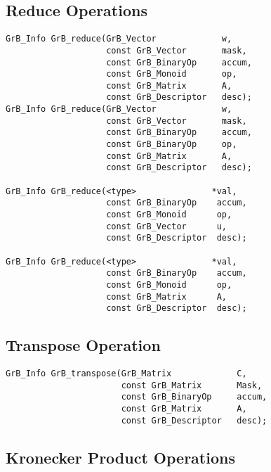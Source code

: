\documentclass[11pt]{article}
\begin{document}
\subsection{Reduce Operations}

\begin{verbatim}
GrB_Info GrB_reduce(GrB_Vector             w,
                    const GrB_Vector       mask,
                    const GrB_BinaryOp     accum,
                    const GrB_Monoid       op,  
                    const GrB_Matrix       A,
                    const GrB_Descriptor   desc);
GrB_Info GrB_reduce(GrB_Vector             w,
                    const GrB_Vector       mask,
                    const GrB_BinaryOp     accum,
                    const GrB_BinaryOp     op,  
                    const GrB_Matrix       A,
                    const GrB_Descriptor   desc);

GrB_Info GrB_reduce(<type>               *val,
                    const GrB_BinaryOp    accum,
                    const GrB_Monoid      op,
                    const GrB_Vector      u,
                    const GrB_Descriptor  desc);

GrB_Info GrB_reduce(<type>               *val,
                    const GrB_BinaryOp    accum,
                    const GrB_Monoid      op,
                    const GrB_Matrix      A,
                    const GrB_Descriptor  desc);
\end{verbatim}

\subsection{Transpose Operation}

\begin{verbatim}
GrB_Info GrB_transpose(GrB_Matrix             C,
                       const GrB_Matrix       Mask,
                       const GrB_BinaryOp     accum,
                       const GrB_Matrix       A,
                       const GrB_Descriptor   desc);
\end{verbatim}

\subsection{Kronecker Product Operations}
\end{document}
